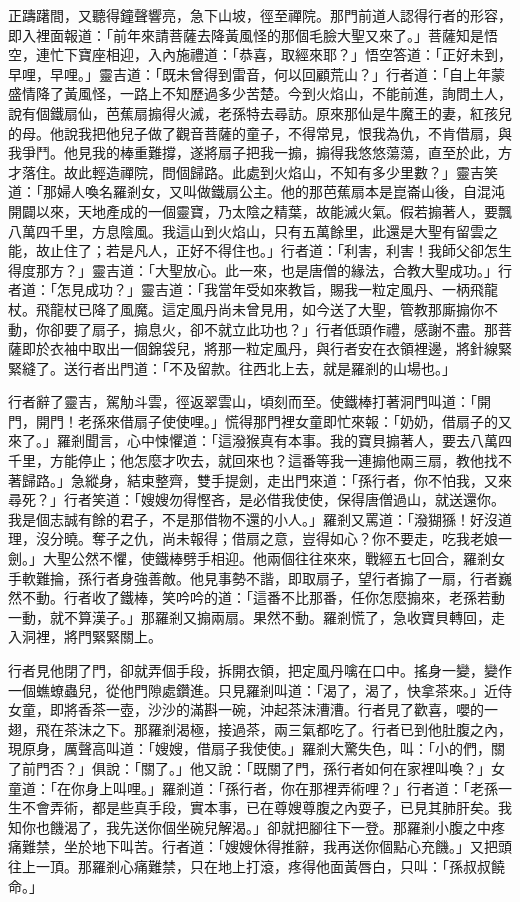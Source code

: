 正躊躇間，又聽得鐘聲響亮，急下山坡，徑至禪院。那門前道人認得行者的形容，即入裡面報道：「前年來請菩薩去降黃風怪的那個毛臉大聖又來了。」菩薩知是悟空，連忙下寶座相迎，入內施禮道：「恭喜，取經來耶？」悟空答道：「正好未到，早哩，早哩。」靈吉道：「既未曾得到雷音，何以回顧荒山？」行者道：「自上年蒙盛情降了黃風怪，一路上不知歷過多少苦楚。今到火焰山，不能前進，詢問土人，說有個鐵扇仙，芭蕉扇搧得火滅，老孫特去尋訪。原來那仙是牛魔王的妻，紅孩兒的母。他說我把他兒子做了觀音菩薩的童子，不得常見，恨我為仇，不肯借扇，與我爭鬥。他見我的棒重難撐，遂將扇子把我一搧，搧得我悠悠蕩蕩，直至於此，方才落住。故此輕造禪院，問個歸路。此處到火焰山，不知有多少里數？」靈吉笑道：「那婦人喚名羅剎女，又叫做鐵扇公主。他的那芭蕉扇本是崑崙山後，自混沌開闢以來，天地產成的一個靈寶，乃太陰之精葉，故能滅火氣。假若搧著人，要飄八萬四千里，方息陰風。我這山到火焰山，只有五萬餘里，此還是大聖有留雲之能，故止住了；若是凡人，正好不得住也。」行者道：「利害，利害！我師父卻怎生得度那方？」靈吉道：「大聖放心。此一來，也是唐僧的緣法，合教大聖成功。」行者道：「怎見成功？」靈吉道：「我當年受如來教旨，賜我一粒定風丹、一柄飛龍杖。飛龍杖已降了風魔。這定風丹尚未曾見用，如今送了大聖，管教那廝搧你不動，你卻要了扇子，搧息火，卻不就立此功也？」行者低頭作禮，感謝不盡。那菩薩即於衣袖中取出一個錦袋兒，將那一粒定風丹，與行者安在衣領裡邊，將針線緊緊縫了。送行者出門道：「不及留款。往西北上去，就是羅剎的山場也。」

行者辭了靈吉，駕觔斗雲，徑返翠雲山，頃刻而至。使鐵棒打著洞門叫道：「開門，開門！老孫來借扇子使使哩。」慌得那門裡女童即忙來報：「奶奶，借扇子的又來了。」羅剎聞言，心中悚懼道：「這潑猴真有本事。我的寶貝搧著人，要去八萬四千里，方能停止；他怎麼才吹去，就回來也？這番等我一連搧他兩三扇，教他找不著歸路。」急縱身，結束整齊，雙手提劍，走出門來道：「孫行者，你不怕我，又來尋死？」行者笑道：「嫂嫂勿得慳吝，是必借我使使，保得唐僧過山，就送還你。我是個志誠有餘的君子，不是那借物不還的小人。」羅剎又罵道：「潑猢猻！好沒道理，沒分曉。奪子之仇，尚未報得；借扇之意，豈得如心？你不要走，吃我老娘一劍。」大聖公然不懼，使鐵棒劈手相迎。他兩個往往來來，戰經五七回合，羅剎女手軟難掄，孫行者身強善敵。他見事勢不諧，即取扇子，望行者搧了一扇，行者巍然不動。行者收了鐵棒，笑吟吟的道：「這番不比那番，任你怎麼搧來，老孫若動一動，就不算漢子。」那羅剎又搧兩扇。果然不動。羅剎慌了，急收寶貝轉回，走入洞裡，將門緊緊關上。

行者見他閉了門，卻就弄個手段，拆開衣領，把定風丹噙在口中。搖身一變，變作一個蟭蟟蟲兒，從他門隙處鑽進。只見羅剎叫道：「渴了，渴了，快拿茶來。」近侍女童，即將香茶一壺，沙沙的滿斟一碗，沖起茶沫漕漕。行者見了歡喜，嚶的一翅，飛在茶沫之下。那羅剎渴極，接過茶，兩三氣都吃了。行者已到他肚腹之內，現原身，厲聲高叫道：「嫂嫂，借扇子我使使。」羅剎大驚失色，叫：「小的們，關了前門否？」俱說：「關了。」他又說：「既關了門，孫行者如何在家裡叫喚？」女童道：「在你身上叫哩。」羅剎道：「孫行者，你在那裡弄術哩？」行者道：「老孫一生不會弄術，都是些真手段，實本事，已在尊嫂尊腹之內耍子，已見其肺肝矣。我知你也饑渴了，我先送你個坐碗兒解渴。」卻就把腳往下一登。那羅剎小腹之中疼痛難禁，坐於地下叫苦。行者道：「嫂嫂休得推辭，我再送你個點心充饑。」又把頭往上一頂。那羅剎心痛難禁，只在地上打滾，疼得他面黃唇白，只叫：「孫叔叔饒命。」

